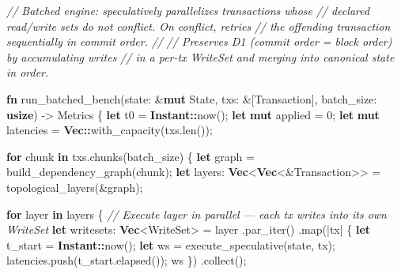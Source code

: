\documentclass[11pt,a4paper]{article}
\providecommand{\NormalTok}[1]{#1}
\providecommand{\KeywordTok}[1]{\textbf{#1}}
\providecommand{\DataTypeTok}[1]{\textbf{#1}}
\providecommand{\CommentTok}[1]{\textit{#1}}
\providecommand{\OperatorTok}[1]{#1}
\providecommand{\ControlFlowTok}[1]{\textbf{#1}}
\providecommand{\DecValTok}[1]{#1}
\providecommand{\PreprocessorTok}[1]{\textbf{#1}}
\newenvironment{Shaded}{}{}
\newenvironment{Highlighting}[1][]{\par\noindent\begin{minipage}{\linewidth}\ttfamily\small}{\end{minipage}\par}
\begin{document}
\begin{Shaded}
\begin{Highlighting}[]
\CommentTok{// Batched engine: speculatively parallelizes transactions whose}
\CommentTok{// declared read/write sets do not conflict. On conflict, retries}
\CommentTok{// the offending transaction sequentially in commit order.}
\CommentTok{//}
\CommentTok{// Preserves D1 (commit order = block order) by accumulating writes}
\CommentTok{// in a per{-}tx WriteSet and merging into canonical state in order.}

\KeywordTok{fn}\NormalTok{ run\_batched\_bench(state}\OperatorTok{:} \OperatorTok{\&}\KeywordTok{mut}\NormalTok{ State}\OperatorTok{,}\NormalTok{ txs}\OperatorTok{:} \OperatorTok{\&}\NormalTok{[Transaction]}\OperatorTok{,}\NormalTok{ batch\_size}\OperatorTok{:} \DataTypeTok{usize}\NormalTok{) }\OperatorTok{{-}\textgreater{}}\NormalTok{ Metrics }\OperatorTok{\{}
    \KeywordTok{let}\NormalTok{ t0 }\OperatorTok{=} \PreprocessorTok{Instant::}\NormalTok{now()}\OperatorTok{;}
    \KeywordTok{let} \KeywordTok{mut}\NormalTok{ applied }\OperatorTok{=} \DecValTok{0}\OperatorTok{;}
    \KeywordTok{let} \KeywordTok{mut}\NormalTok{ latencies }\OperatorTok{=} \DataTypeTok{Vec}\PreprocessorTok{::}\NormalTok{with\_capacity(txs}\OperatorTok{.}\NormalTok{len())}\OperatorTok{;}

    \ControlFlowTok{for}\NormalTok{ chunk }\KeywordTok{in}\NormalTok{ txs}\OperatorTok{.}\NormalTok{chunks(batch\_size) }\OperatorTok{\{}
        \KeywordTok{let}\NormalTok{ graph }\OperatorTok{=}\NormalTok{ build\_dependency\_graph(chunk)}\OperatorTok{;}
        \KeywordTok{let}\NormalTok{ layers}\OperatorTok{:} \DataTypeTok{Vec}\OperatorTok{\textless{}}\DataTypeTok{Vec}\OperatorTok{\textless{}\&}\NormalTok{Transaction}\OperatorTok{\textgreater{}\textgreater{}} \OperatorTok{=}\NormalTok{ topological\_layers(}\OperatorTok{\&}\NormalTok{graph)}\OperatorTok{;}

        \ControlFlowTok{for}\NormalTok{ layer }\KeywordTok{in}\NormalTok{ layers }\OperatorTok{\{}
            \CommentTok{// Execute layer in parallel — each tx writes into its own WriteSet}
            \KeywordTok{let}\NormalTok{ writesets}\OperatorTok{:} \DataTypeTok{Vec}\OperatorTok{\textless{}}\NormalTok{WriteSet}\OperatorTok{\textgreater{}} \OperatorTok{=}\NormalTok{ layer}
                \OperatorTok{.}\NormalTok{par\_iter()}
                \OperatorTok{.}\NormalTok{map(}\OperatorTok{|}\NormalTok{tx}\OperatorTok{|} \OperatorTok{\{}
                    \KeywordTok{let}\NormalTok{ t\_start }\OperatorTok{=} \PreprocessorTok{Instant::}\NormalTok{now()}\OperatorTok{;}
                    \KeywordTok{let}\NormalTok{ ws }\OperatorTok{=}\NormalTok{ execute\_speculative(state}\OperatorTok{,}\NormalTok{ tx)}\OperatorTok{;}
\NormalTok{                    latencies}\OperatorTok{.}\NormalTok{push(t\_start}\OperatorTok{.}\NormalTok{elapsed())}\OperatorTok{;}
\NormalTok{                    ws}
                \OperatorTok{\}}\NormalTok{)}
                \OperatorTok{.}\NormalTok{collect()}\OperatorTok{;}


\end{Highlighting}
\end{Shaded}
\end{document}
